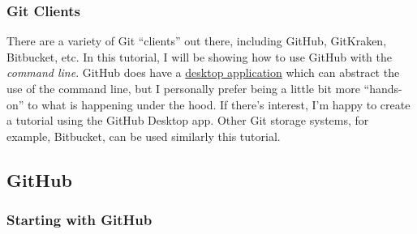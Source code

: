 \documentclass[
  letterpaper,
  DIV=11,
  numbers=noendperiod]{scrartcl}
\begin{document}
\hypertarget{git-clients}{%
\subsubsection{Git Clients}\label{git-clients}}

There are a variety of Git ``clients'' out there, including GitHub,
GitKraken, Bitbucket, etc. In this tutorial, I will be showing how to
use GitHub with the \emph{command line}. GitHub does have a
\href{https://desktop.github.com/}{desktop application} which can
abstract the use of the command line, but I personally prefer being a
little bit more ``hands-on'' to what is happening under the hood. If
there's interest, I'm happy to create a tutorial using the GitHub
Desktop app. Other Git storage systems, for example, Bitbucket, can be
used similarly this tutorial.

\hypertarget{github}{%
\subsection{GitHub}\label{github}}

\hypertarget{starting-with-github}{%
\subsubsection{Starting with GitHub}\label{starting-with-github}}
\end{document}
